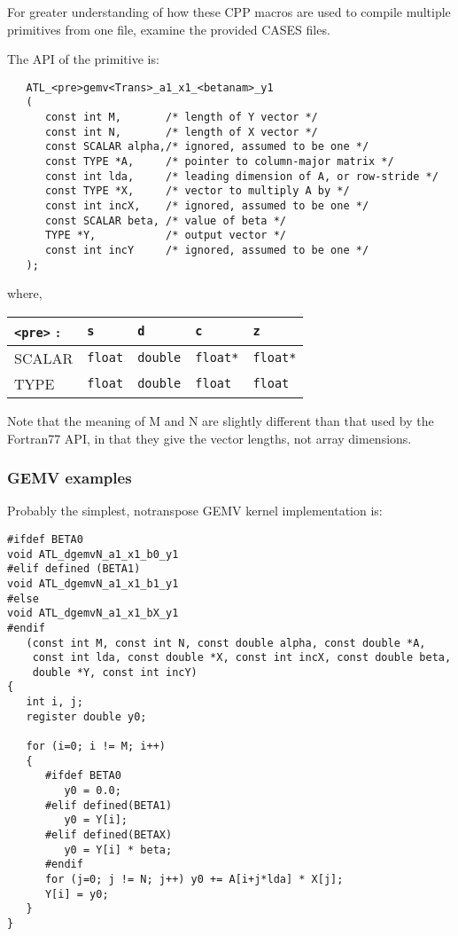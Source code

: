 \documentclass[11pt]{article}
\begin{document}
For greater understanding of how these CPP macros are used to compile multiple
primitives from one file, examine the provided CASES files.

The API of the primitive is:
\begin{verbatim}
   ATL_<pre>gemv<Trans>_a1_x1_<betanam>_y1
   (
      const int M,       /* length of Y vector */
      const int N,       /* length of X vector */
      const SCALAR alpha,/* ignored, assumed to be one */
      const TYPE *A,     /* pointer to column-major matrix */
      const int lda,     /* leading dimension of A, or row-stride */
      const TYPE *X,     /* vector to multiply A by */
      const int incX,    /* ignored, assumed to be one */
      const SCALAR beta, /* value of beta */
      TYPE *Y,           /* output vector */
      const int incY     /* ignored, assumed to be one */
   );
\end{verbatim}

where,
\begin{tabular}{||l|l|l|l|l||}\hline\hline
\verb+<pre>+ : & {\tt s} & {\tt d} & {\tt c} & {\tt z} \\\hline\hline
SCALAR & {\tt float} & {\tt double} & {\tt float*} & {\tt float*} \\\hline
TYPE   & {\tt float} & {\tt double} & {\tt float} & {\tt float} \\\hline\hline
\end{tabular}

Note that the meaning of M and N are slightly different than that used by the
Fortran77 API, in that they give the vector lengths, not array dimensions.

\subsubsection{GEMV examples}

Probably the simplest, notranspose GEMV kernel implementation is:
\begin{verbatim}
#ifdef BETA0
void ATL_dgemvN_a1_x1_b0_y1
#elif defined (BETA1)
void ATL_dgemvN_a1_x1_b1_y1
#else
void ATL_dgemvN_a1_x1_bX_y1
#endif
   (const int M, const int N, const double alpha, const double *A, 
    const int lda, const double *X, const int incX, const double beta,
    double *Y, const int incY)
{
   int i, j;
   register double y0;

   for (i=0; i != M; i++)
   {
      #ifdef BETA0
         y0 = 0.0;
      #elif defined(BETA1)
         y0 = Y[i];
      #elif defined(BETAX)
         y0 = Y[i] * beta;
      #endif
      for (j=0; j != N; j++) y0 += A[i+j*lda] * X[j];
      Y[i] = y0;
   }
}
\end{verbatim}
\end{document}
